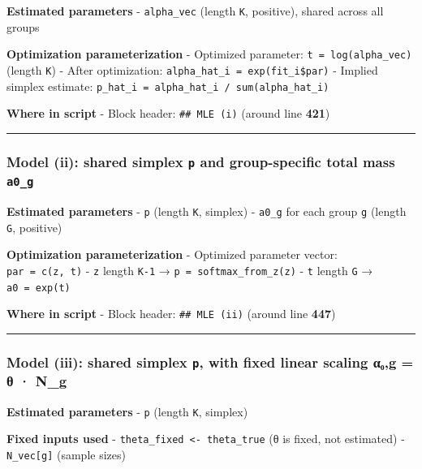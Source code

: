 \documentclass[
]{article}
\begin{document}
\textbf{Estimated parameters} - \texttt{alpha\_vec} (length \texttt{K},
positive), shared across all groups

\textbf{Optimization parameterization} - Optimized parameter:
\texttt{t\ =\ log(alpha\_vec)} (length \texttt{K}) - After optimization:
\texttt{alpha\_hat\_i\ =\ exp(fit\_i\$par)} - Implied simplex estimate:
\texttt{p\_hat\_i\ =\ alpha\_hat\_i\ /\ sum(alpha\_hat\_i)}

\textbf{Where in script} - Block header: \texttt{\#\#\ MLE\ (i)} (around
line \textbf{421})

\begin{center}\rule{0.5\linewidth}{0.5pt}\end{center}

\subsubsection{\texorpdfstring{Model (ii): shared simplex \texttt{p} and
group-specific total mass
\texttt{a0\_g}}{Model (ii): shared simplex p and group-specific total mass a0\_g}}\label{model-ii-shared-simplex-p-and-group-specific-total-mass-a0_g}

\textbf{Estimated parameters} - \texttt{p} (length \texttt{K}, simplex)
- \texttt{a0\_g} for each group \texttt{g} (length \texttt{G}, positive)

\textbf{Optimization parameterization} - Optimized parameter vector:
\texttt{par\ =\ c(z,\ t)} - \texttt{z} length \texttt{K-1} →
\texttt{p\ =\ softmax\_from\_z(z)} - \texttt{t} length \texttt{G} →
\texttt{a0\ =\ exp(t)}

\textbf{Where in script} - Block header: \texttt{\#\#\ MLE\ (ii)}
(around line \textbf{447})

\begin{center}\rule{0.5\linewidth}{0.5pt}\end{center}

\subsubsection{\texorpdfstring{Model (iii): shared simplex \texttt{p},
with fixed linear scaling α₀,g = θ ·
N\_g}{Model (iii): shared simplex p, with fixed linear scaling α₀,g = θ · N\_g}}\label{model-iii-shared-simplex-p-with-fixed-linear-scaling-ux3b1ux2080g-ux3b8-n_g}

\textbf{Estimated parameters} - \texttt{p} (length \texttt{K}, simplex)

\textbf{Fixed inputs used} -
\texttt{theta\_fixed\ \textless{}-\ theta\_true} (θ is fixed, not
estimated) - \texttt{N\_vec{[}g{]}} (sample sizes)
\end{document}
